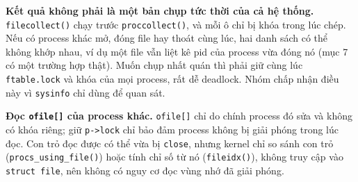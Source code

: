 \item \textbf{Kết quả không phải là một bản chụp tức thời của cả hệ thống.} \texttt{filecollect()} chạy trước \texttt{proccollect()}, và mỗi ô chỉ bị khóa trong lúc chép. Nếu có process khác mở, đóng file hay thoát cùng lúc, hai danh sách có thể không khớp nhau, ví dụ một file vẫn liệt kê pid của process vừa đóng nó (mục 7 có một trường hợp thật). Muốn chụp nhất quán thì phải giữ cùng lúc \texttt{ftable.lock} và khóa của mọi process, rất dễ deadlock. Nhóm chấp nhận điều này vì \texttt{sysinfo} chỉ dùng để quan sát.

\item \textbf{Đọc \texttt{ofile[]} của process khác.} \texttt{ofile[]} chỉ do chính process đó sửa và không có khóa riêng; giữ \texttt{p->lock} chỉ bảo đảm process không bị giải phóng trong lúc đọc. Con trỏ đọc được có thể vừa bị \texttt{close}, nhưng kernel chỉ so sánh con trỏ (\texttt{procs\_using\_file()}) hoặc tính chỉ số từ nó (\texttt{fileidx()}), không truy cập vào \texttt{struct file}, nên không có nguy cơ đọc vùng nhớ đã giải phóng.
